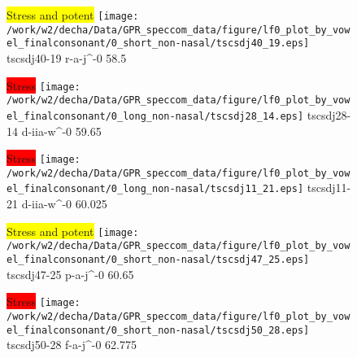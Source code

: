 \documentclass{article}
\begin{document}
\begin{figure}[t]
\begin{minipage}[b]{.24\textwidth}
\colorbox{yellow}{Stress and potent}
\centering
\texttt{[image: /work/w2/decha/Data/GPR\_speccom\_data/figure/lf0\_plot\_by\_vowel\_finalconsonant/0\_short\_non-nasal/tscsdj40\_19.eps]}
tscsdj40-19 r-a-j\textasciicircum-0 58.5
\end{minipage}
\begin{minipage}[b]{.24\textwidth}
\colorbox{red}{Stress}
\centering
\texttt{[image: /work/w2/decha/Data/GPR\_speccom\_data/figure/lf0\_plot\_by\_vowel\_finalconsonant/0\_long\_non-nasal/tscsdj28\_14.eps]}
tscsdj28-14 d-iia-w\textasciicircum-0 59.65
\end{minipage}
\begin{minipage}[b]{.24\textwidth}
\colorbox{red}{Stress}
\centering
\texttt{[image: /work/w2/decha/Data/GPR\_speccom\_data/figure/lf0\_plot\_by\_vowel\_finalconsonant/0\_long\_non-nasal/tscsdj11\_21.eps]}
tscsdj11-21 d-iia-w\textasciicircum-0 60.025
\end{minipage}
\begin{minipage}[b]{.24\textwidth}
\colorbox{yellow}{Stress and potent}
\centering
\texttt{[image: /work/w2/decha/Data/GPR\_speccom\_data/figure/lf0\_plot\_by\_vowel\_finalconsonant/0\_short\_non-nasal/tscsdj47\_25.eps]}
tscsdj47-25 p-a-j\textasciicircum-0 60.65
\end{minipage}
\end{figure}
\clearpage
\begin{figure}[t]
\begin{minipage}[b]{.24\textwidth}
\colorbox{red}{Stress}
\centering
\texttt{[image: /work/w2/decha/Data/GPR\_speccom\_data/figure/lf0\_plot\_by\_vowel\_finalconsonant/0\_short\_non-nasal/tscsdj50\_28.eps]}
tscsdj50-28 f-a-j\textasciicircum-0 62.775
\end{minipage}
\end{figure}
\end{document}
